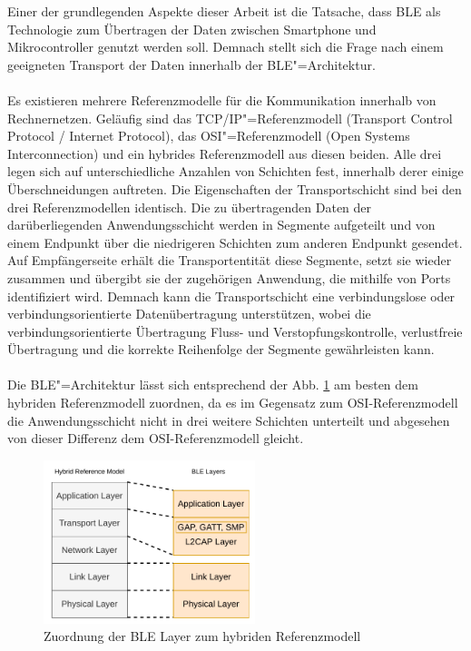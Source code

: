 Einer der grundlegenden Aspekte dieser Arbeit ist die Tatsache, dass BLE als Technologie zum Übertragen der Daten zwischen Smartphone und Mikrocontroller genutzt werden soll. Demnach stellt sich die Frage nach einem geeigneten Transport der Daten innerhalb der BLE"=Architektur.
\\\\
Es existieren mehrere Referenzmodelle für die Kommunikation innerhalb von Rechnernetzen. Geläufig sind das TCP/IP"=Referenzmodell (Transport Control Protocol / Internet Protocol), das OSI"=Referenzmodell (Open Systems Interconnection) und ein hybrides Referenzmodell aus diesen beiden. Alle drei legen sich auf unterschiedliche Anzahlen von Schichten fest, innerhalb derer einige Überschneidungen auftreten. Die Eigenschaften der Transportschicht sind bei den drei Referenzmodellen identisch. Die zu übertragenden Daten der darüberliegenden Anwendungsschicht werden in Segmente aufgeteilt und von einem Endpunkt über die niedrigeren Schichten zum anderen Endpunkt gesendet. Auf Empfängerseite erhält die Transportentität diese Segmente, setzt sie wieder zusammen und übergibt sie der zugehörigen Anwendung, die mithilfe von Ports identifiziert wird. Demnach kann die Transportschicht eine verbindungslose oder verbindungsorientierte Datenübertragung unterstützen, wobei die verbindungsorientierte Übertragung Fluss- und Verstopfungskontrolle, verlustfreie Übertragung und die korrekte Reihenfolge der Segmente gewährleisten kann. \cite{Baun2019_36-40}
\\\\
Die BLE"=Architektur lässt sich entsprechend der Abb. \ref{fig: hyb referenzmodell ble} am besten dem hybriden Referenzmodell zuordnen, da es im Gegensatz zum OSI-Referenzmodell die Anwendungsschicht nicht in drei weitere Schichten unterteilt und abgesehen von dieser Differenz dem OSI-Referenzmodell gleicht.

\begin{figure}[H]
    \centering
    \includegraphics[width=0.55\textwidth]{graphics/hybr_referenzmodell_zu_ble.pdf}
    \caption[Zuordnung der BLE Layer zum hybriden Referenzmodell]{Zuordnung der BLE Layer zum hybriden Referenzmodell}
    \label{fig: hyb referenzmodell ble}
\end{figure}

